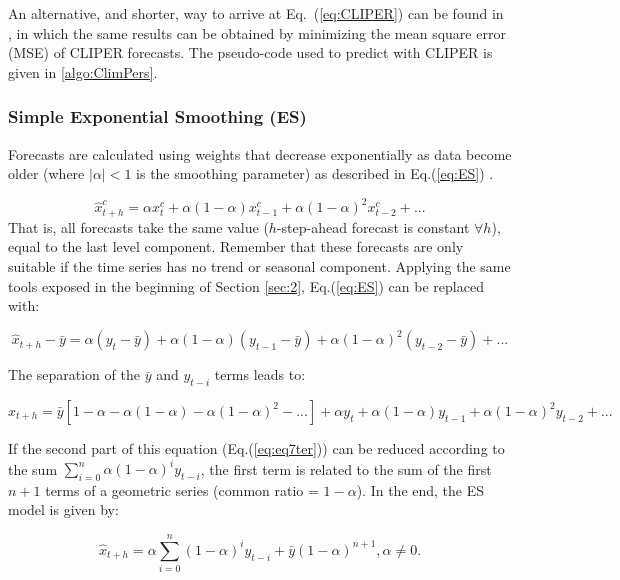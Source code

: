 An alternative, and shorter, way to arrive at Eq.~(\ref{eq:CLIPER}) can be found in \citep{doi:10.1063/1.5114985}, in which the same results can be obtained by minimizing the mean square error (MSE) of CLIPER forecasts. The pseudo-code used to predict with CLIPER is given in \ref{algo:ClimPers}.




\subsubsection{Simple Exponential Smoothing \textnormal{(ES)}}
\label{sec:ETS}
Forecasts are calculated using weights that decrease exponentially as data become older (where $\vert \alpha \vert <1$ is the smoothing parameter) as described in Eq.(\ref{eq:ES}) \citep{hyndman_forecasting_2018}.

\begin{equation}
\label{eq:ES}
    \widehat{x}^c_{t+h}=\alpha x^c_t+\alpha(1-\alpha)x^c_{t-1}+\alpha(1-\alpha)^2x^c_{t-2}+...
\end{equation}
That is, all forecasts take the same value ($h$-step-ahead forecast is constant $\forall h$), equal to the last level component. Remember that these forecasts are only  suitable if the time series has no trend or seasonal component. Applying the same tools exposed in the beginning of Section \ref{sec:2}, Eq.(\ref{eq:ES}) can be replaced with:

\begin{equation}
\label{eq:eq7bis}
    \widehat{x}_{t+h}-\bar{y}=\alpha( y_t-\bar{y})+\alpha(1-\alpha)(y_{t-1}-\bar{y})+\alpha(1-\alpha)^2(y_{t-2}-\bar{y})+...
\end{equation}

The separation of the $\bar{y}$ and $y_{t-i}$ terms leads to:

\begin{equation}
\label{eq:eq7ter}
    \widehat{x}_{t+h}=\bar{y}[1-\alpha-\alpha(1-\alpha)-\alpha(1-\alpha)^2-...] + \alpha y_t+\alpha(1-\alpha)y_{t-1}+\alpha(1-\alpha)^2y_{t-2}+...
\end{equation}

If the second part of this equation (Eq.(\ref{eq:eq7ter})) can be reduced according to the sum $\sum_{i=0}^{n} \alpha(1-\alpha)^i y_{t-i}$, the first term is related to the sum of the first $n+1$ terms of a geometric series (common ratio = $1-\alpha$). In the end, the ES model is given by: 

\begin{equation}
\label{eq:eq7}
    \widehat{x}_{t+h}=\alpha \sum_{i=0}^{n} (1-\alpha)^i y_{t-i} +\bar{y}(1-\alpha)^{n+1},\alpha \neq 0.
\end{equation}

